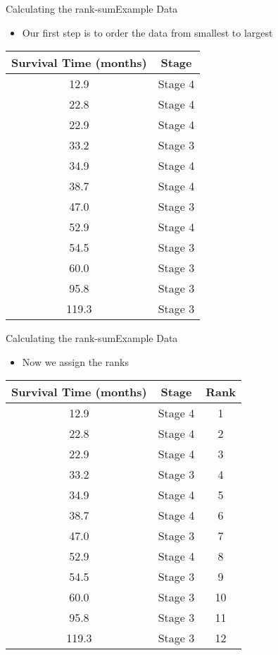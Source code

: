 \documentclass[xcolor=dvipsnames]{beamer}
\begin{document}
\begin{frame}{Calculating the rank-sum}{Example Data}
\begin{itemize}
	\item Our first step is to order the data from smallest to largest
\end{itemize}
\begin{center}
	\begin{tabular}{|c|c|}
		\hline
		\textbf{Survival Time (months)} &  \textbf{Stage} \\ \hline \hline
		12.9 &Stage 4 \\ \hline
		22.8 &Stage 4 \\ \hline
		22.9& Stage 4 \\ \hline
		33.2 &Stage 3 \\ \hline
		34.9& Stage 4 \\ \hline
		38.7 &Stage 4 \\ \hline
		47.0 &Stage 3 \\ \hline		
		52.9  &Stage 4 \\ \hline
		54.5 &Stage 3 \\ \hline				
		60.0 &Stage 3 \\ \hline
		95.8& Stage 3 \\ \hline
		119.3 &Stage 3 \\ \hline
	\end{tabular}
\end{center}
\end{frame}

\begin{frame}{Calculating the rank-sum}{Example Data}
\begin{itemize}
	\item Now we assign the ranks
\end{itemize}
\begin{center}
	\begin{tabular}{|c|c|c|}
		\hline
		\textbf{Survival Time (months)} &  \textbf{Stage} & \textbf{Rank}\\ \hline \hline
		12.9 &Stage 4 & 1 \\ \hline
		22.8 &Stage 4 & 2\\ \hline
		22.9& Stage 4 & 3\\ \hline
		33.2 &Stage 3 & 4\\ \hline
		34.9& Stage 4 & 5\\ \hline
		38.7 &Stage 4 & 6\\ \hline
		47.0 &Stage 3 & 7\\ \hline		
		52.9  &Stage 4 & 8\\ \hline
		54.5 &Stage 3 & 9\\ \hline				
		60.0 &Stage 3 & 10\\ \hline
		95.8& Stage 3 & 11\\ \hline
		119.3 &Stage 3 & 12\\ \hline
	\end{tabular}
\end{center}
\end{frame}
\end{document}
